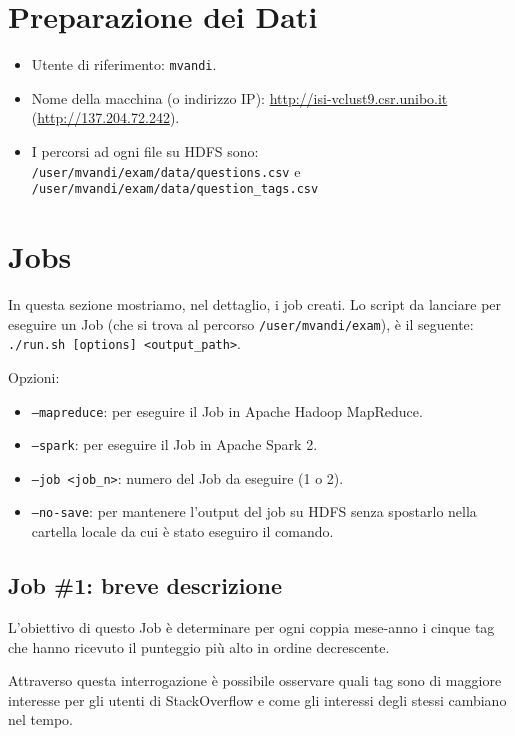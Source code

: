 \documentclass[10pt]{article}
\begin{document}
\section{Preparazione dei Dati}

\begin{itemize}
\item Utente di riferimento: \texttt{mvandi}.
\item Nome della macchina (o indirizzo IP): \url{http://isi-vclust9.csr.unibo.it} (\url{http://137.204.72.242}).
\item I percorsi ad ogni file su HDFS sono: \texttt{/user/mvandi/exam/data/questions.csv} e \texttt{/user/mvandi/exam/data/question\_tags.csv}
\end{itemize}

\section{Jobs}

In questa sezione mostriamo, nel dettaglio, i job creati.
Lo script da lanciare per eseguire un Job (che si trova al percorso \texttt{/user/mvandi/exam}), è il seguente:
\texttt{./run.sh [options] <output\_path>}.

Opzioni:
\begin{itemize}
    \item \texttt{--mapreduce}: per eseguire il Job in Apache Hadoop MapReduce.
    \item \texttt{--spark}: per eseguire il Job in Apache Spark 2.
    \item \texttt{--job <job\_n>}: numero del Job da eseguire (1 o 2).
    \item \texttt{--no-save}: per mantenere l'output del job su HDFS senza spostarlo nella cartella locale da cui è stato eseguiro il comando.
\end{itemize}

\subsection{Job \#1: breve descrizione}

L'obiettivo di questo Job è determinare per ogni coppia mese-anno i cinque tag che hanno ricevuto il punteggio più alto in ordine decrescente.

Attraverso questa interrogazione è possibile osservare quali tag sono di maggiore interesse per gli utenti di StackOverflow e come gli interessi degli stessi cambiano nel tempo.
\end{document}
